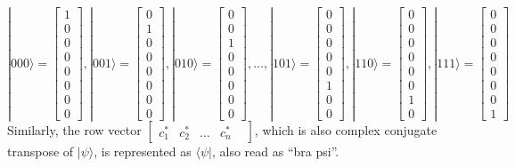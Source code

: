 \documentclass[11pt]{article}
\newcommand{\ket}[1]{|#1\rangle}
\newcommand{\bra}[1]{\langle #1|}
\begin{document}
\[
\ket{000}=\begin{bmatrix} 1\\ 0\\ 0\\ 0\\ 0\\ 0\\ 0\\ 0 \end{bmatrix},
\ket{001}=\begin{bmatrix} 0\\ 1\\ 0\\ 0\\ 0\\ 0\\ 0\\ 0 \end{bmatrix},
\ket{010}=\begin{bmatrix} 0\\ 0\\ 1\\ 0\\ 0\\ 0\\ 0\\ 0 \end{bmatrix},
\dots,
\ket{101}=\begin{bmatrix} 0\\ 0\\ 0\\ 0\\ 0\\ 1\\ 0\\ 0 \end{bmatrix},
\ket{110}=\begin{bmatrix} 0\\ 0\\ 0\\ 0\\ 0\\ 0\\ 1\\ 0 \end{bmatrix},
\ket{111}=\begin{bmatrix} 0\\ 0\\ 0\\ 0\\ 0\\ 0\\ 0\\ 1 \end{bmatrix}
\]
Similarly, the row vector $\begin{bmatrix} c^\ast_1 & c^\ast_2  & \dots & c^\ast_n & \end{bmatrix}$, which is also complex conjugate transpose of $\ket{\psi}$, is represented as $\bra{\psi}$, also read as ``bra psi''.\medskip
\end{document}
